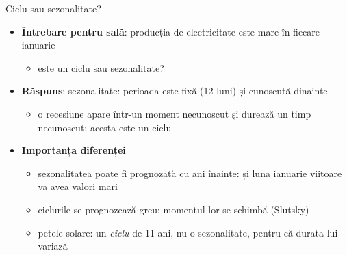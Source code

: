 \begin{frame}{Ciclu sau sezonalitate?}
\itemsize{\small}
\begin{itemize}
    \item \textbf{Întrebare pentru sală}: producția de electricitate este mare în fiecare ianuarie
    \begin{itemize}
        \item este un ciclu sau sezonalitate?
    \end{itemize}
    \pause
    \item \textbf{Răspuns}: sezonalitate: perioada este fixă (12 luni) și cunoscută dinainte
    \begin{itemize}
        \item o recesiune apare într-un moment necunoscut și durează un timp necunoscut: acesta este un ciclu
    \end{itemize}
    \item \textbf{Importanța diferenței}
    \begin{itemize}
        \item sezonalitatea poate fi prognozată cu ani înainte: și luna ianuarie viitoare va avea valori mari
        \item ciclurile se prognozează greu: momentul lor se schimbă (Slutsky)
        \item petele solare: un \emph{ciclu} de 11 ani, nu o sezonalitate, pentru că durata lui variază
    \end{itemize}
\end{itemize}
\end{frame}

